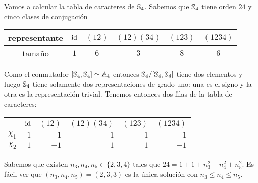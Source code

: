 \begin{example}
	Vamos a calcular la tabla de caracteres de $\mathbb{S}_4$. Sabemos que $\mathbb{S}_4$ 
	tiene orden $24$ y cinco clases de conjugación 
	\begin{center}
		\begin{tabular}{c|ccccc}
			representante & $\operatorname{id}$ & $(12)$ & $(12)(34)$ & $(123)$ & $(1234)$\tabularnewline
			\hline
			tamaño & $1$ & $6$ & $3$ & $8$ & $6$
		\end{tabular}
	\end{center}

	Como el conmutador $[\mathbb{S}_4,\mathbb{S}_4]\simeq\mathbb{A}_4$ entonces
	$\mathbb{S}_4/[\mathbb{S}_4,\mathbb{S}_4]$ tiene dos elementos y luego $\mathbb{S}_4$ tiene
	solamente dos representaciones de grado uno: una es el signo y la otra es
	la representación trivial. Tenemos entonces dos filas de la tabla de caracteres:
	\begin{center}
		\begin{tabular}{|c|rrrrr|}
			\hline
			& $\operatorname{id}$ & $(12)$ & $(12)(34)$ & $(123)$ & $(1234)$\tabularnewline
			\hline
			$\chi_1$ & $1$ & $1$ & $1$ & $1$ & $1$\tabularnewline
			$\chi_2$ & $1$ & $-1$ & $1$ & $1$ & $-1$\tabularnewline
			\hline
		\end{tabular}
	\end{center}
	Sabemos que existen $n_3,n_4,n_5\in\{2,3,4\}$ tales que
	$24=1+1+n_3^2+n_4^2+n_5^2$. Es fácil ver que $(n_3,n_4,n_5)=(2,3,3)$ es la
	única solución con $n_3\leq n_4\leq n_5$.


\end{example}
